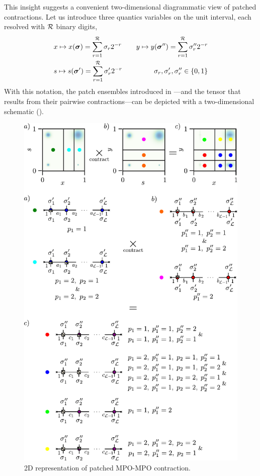 This insight suggests a convenient two-dimensional diagrammatic view of patched contractions. Let us introduce three quantics variables on the unit interval, each resolved with $\mathcal{R}$ binary digits,
\begin{equation}
    \begin{aligned}
        &x \mapsto x(\boldsymbol{\sigma}) = \sum_{r=1}^{\mathcal{R}} \sigma_r 2^{-r} \quad &y \mapsto y(\boldsymbol{\sigma}'') = \sum_{r=1}^{\mathcal{R}} \sigma''_r 2^{-r}\\ 
        &s \mapsto s(\boldsymbol{\sigma}') = \sum_{r=1}^{\mathcal{R}} \sigma'_r 2^{-r} \quad &\sigma_r,\sigma'_r,\sigma''_r \in \{0,1\}
    \end{aligned}
\end{equation}
With this notation, the patch ensembles introduced in —and the tensor that results from their pairwise contractions—can be depicted with a two-dimensional schematic ().

\begin{figure}[htbp]
    \centering
    \includegraphics{figures/2DPatchContrRepr.pdf}
    \caption{2D representation of patched MPO-MPO contraction.}
    \label{fig:2DPatchContrRepr}
\end{figure}

